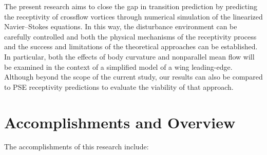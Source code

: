 The present research aims to close the gap in transition prediction by
predicting the receptivity of crossflow vortices through numerical simulation
of the linearized Navier--Stokes equations.  In this way, the disturbance
environment can be carefully controlled and both the physical mechanisms of
the receptivity process and the success and limitations of the theoretical
approaches \cite{Choudhari:94,Crouch:93} can be established.  In particular,
both the effects of body curvature and nonparallel mean flow will be examined
in the context of a simplified model of a wing leading-edge.  Although beyond
the scope of the current study, our results can also be compared to PSE
receptivity predictions to evaluate the viability of that approach.

\section{Accomplishments and Overview \label{s:accomplishments}}

The accomplishments of this research include:

